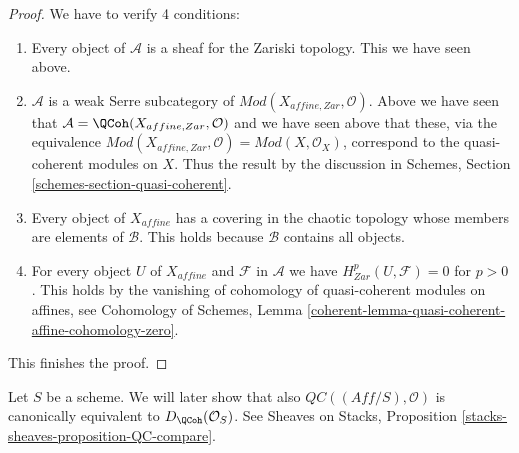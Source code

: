 \begin{proof}
\medskip\noindent
We have to verify 4 conditions:
\begin{enumerate}
\item Every object of $\mathcal{A}$ is a sheaf for the Zariski topology.
This we have seen above.
\item $\mathcal{A}$ is a weak Serre subcategory of
$\textit{Mod}(X_{affine, Zar}, \mathcal{O})$. Above we have
seen that $\mathcal{A} = \QCoh(X_{affine, Zar}, \mathcal{O})$ and
we have seen above that these,
via the equivalence $\textit{Mod}(X_{affine, Zar}, \mathcal{O}) =
\textit{Mod}(X, \mathcal{O}_X)$, correspond to the quasi-coherent modules
on $X$. Thus the result by the discussion in
Schemes, Section \ref{schemes-section-quasi-coherent}.
\item Every object of $X_{affine}$ has a covering in the chaotic
topology whose members are elements of $\mathcal{B}$. This holds
because $\mathcal{B}$ contains all objects.
\item For every object $U$ of $X_{affine}$ and $\mathcal{F}$ in $\mathcal{A}$
we have $H^p_{Zar}(U, \mathcal{F}) = 0$ for $p > 0$.
This holds by the vanishing of cohomology of quasi-coherent modules
on affines, see
Cohomology of Schemes, Lemma
\ref{coherent-lemma-quasi-coherent-affine-cohomology-zero}.
\end{enumerate}
This finishes the proof.
\end{proof}

\begin{remark}
\label{remark-QC-compare}
Let $S$ be a scheme. We will later show that also
$\mathit{QC}((\textit{Aff}/S), \mathcal{O})$
is canonically equivalent to $D_\QCoh(\mathcal{O}_S)$.
See Sheaves on Stacks, Proposition \ref{stacks-sheaves-proposition-QC-compare}.
\end{remark}















